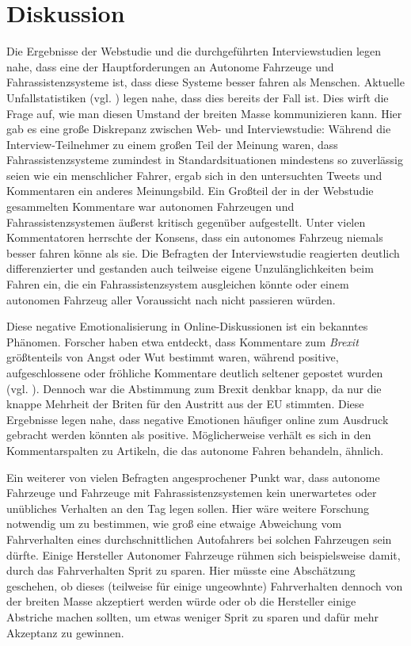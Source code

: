 \section{Diskussion}

Die Ergebnisse der Webstudie und die durchgeführten Interviewstudien legen nahe, dass eine der Hauptforderungen an Autonome Fahrzeuge und Fahrassistenzsysteme ist, dass diese Systeme besser fahren als Menschen. Aktuelle Unfallstatistiken (vgl. \cite{singh2015critical}) legen nahe, dass dies bereits der Fall ist. Dies wirft die Frage auf, wie man diesen Umstand der breiten Masse kommunizieren kann. Hier gab es eine große Diskrepanz zwischen Web- und Interviewstudie: Während die Interview-Teilnehmer zu einem großen Teil der Meinung waren, dass Fahrassistenzsysteme zumindest in Standardsituationen mindestens so zuverlässig seien wie ein menschlicher Fahrer, ergab sich in den untersuchten Tweets und Kommentaren ein anderes Meinungsbild. Ein Großteil der in der Webstudie gesammelten Kommentare war autonomen Fahrzeugen und Fahrassistenzsystemen äußerst kritisch gegenüber aufgestellt. Unter vielen Kommentatoren herrschte der Konsens, dass ein autonomes Fahrzeug niemals besser fahren könne als sie. Die Befragten der Interviewstudie reagierten deutlich differenzierter und gestanden auch teilweise eigene Unzulänglichkeiten beim Fahren ein, die ein Fahrassistenzsystem ausgleichen könnte oder einem autonomen Fahrzeug aller Voraussicht nach nicht passieren würden.

Diese negative Emotionalisierung in Online-Diskussionen ist ein bekanntes Phänomen. Forscher haben etwa entdeckt, dass Kommentare zum \emph{Brexit} größtenteils von Angst oder Wut bestimmt waren, während positive, aufgeschlossene oder fröhliche Kommentare deutlich seltener gepostet wurden (vgl. \cite[4]{bossetta2018shouting}). Dennoch war die Abstimmung zum Brexit denkbar knapp, da nur die knappe Mehrheit der Briten für den Austritt aus der EU stimmten. Diese Ergebnisse legen nahe, dass negative Emotionen häufiger online zum Ausdruck gebracht werden könnten als positive. Möglicherweise verhält es sich in den Kommentarspalten zu Artikeln, die das autonome Fahren behandeln, ähnlich.

Ein weiterer von vielen Befragten angesprochener Punkt war, dass autonome Fahrzeuge und Fahrzeuge mit Fahrassistenzsystemen kein unerwartetes oder unübliches Verhalten an den Tag legen sollen. Hier wäre weitere Forschung notwendig um zu bestimmen, wie groß eine etwaige Abweichung vom Fahrverhalten eines durchschnittlichen Autofahrers bei solchen Fahrzeugen sein dürfte. Einige Hersteller Autonomer Fahrzeuge rühmen sich beispielsweise damit, durch das Fahrverhalten Sprit zu sparen. Hier müsste eine Abschätzung geschehen, ob dieses (teilweise für einige ungeowhnte) Fahrverhalten dennoch von der breiten Masse akzeptiert werden würde oder ob die Hersteller einige Abstriche machen sollten, um etwas weniger Sprit zu sparen und dafür mehr Akzeptanz zu gewinnen.

